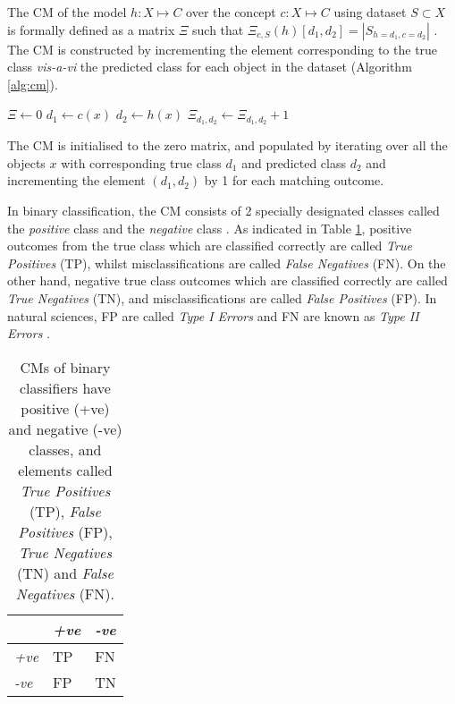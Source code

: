 The CM of the model $h : X \mapsto C$ over the concept $c : X \mapsto C$ using dataset $S \subset X$ is formally defined  as a matrix $\Xi$ such that $\Xi_{c,S}(h)[d_1,d_2] = |S_{h=d_1,c=d_2}|$ \citep{cichosz2014data}. The CM is constructed by incrementing the element corresponding to the true class \textit{vis-a-vi} the predicted class for each object in the dataset (Algorithm \ref{alg:cm}).

\begin{algorithm}
  \begin{algorithmic}
    \State $\Xi \gets 0$
      \State $d_1 \gets c(x)$
      \State $d_2 \gets h(x)$
      \State $\Xi_{d_1,d_2} \gets \Xi_{d_1,d_2} + 1$
    \EndFor
  \end{algorithmic}
  \caption{The CM is initialised to the zero matrix, and populated by iterating over all the objects $x$ with corresponding true class $d_1$ and predicted class $d_2$ and incrementing the element $(d_1,d_2)$ by 1 for each matching outcome.}
  \label{alg:cm}
\end{algorithm}

In binary classification, the CM consists of 2 specially designated classes called the \textit{positive} class and the \textit{negative} class \citep{saito2015precision}. As indicated in Table \ref{tab:cm_binary}, positive outcomes from the true class  which are classified correctly are called \textit{True Positives} (TP), whilst misclassifications are called \textit{False Negatives} (FN). On the other hand, negative true class outcomes which are classified correctly are called \textit{True Negatives} (TN), and misclassifications are called \textit{False Positives} (FP). In natural sciences, FP are called \textit{Type I Errors} and FN are known as \textit{Type II Errors} \citep{fielding1997review}.

\begin{table}[ht]
  \centering
  \selectfont
  \begin{tabular}{lll}
    \toprule
                  & \textit{+ve} & \textit{-ve} \\
    \midrule
    \textit{+ve}  & TP           & FN \\
    \textit{-ve}  & FP           & TN \\
    \bottomrule
  \end{tabular}
  \caption{CMs of binary classifiers have positive (+ve) and negative (-ve) classes, and elements called \textit{True Positives} (TP), \textit{False Positives} (FP), \textit{True Negatives} (TN) and \textit{False Negatives} (FN).}
  \label{tab:cm_binary}
\end{table}
\vspace{2mm}

